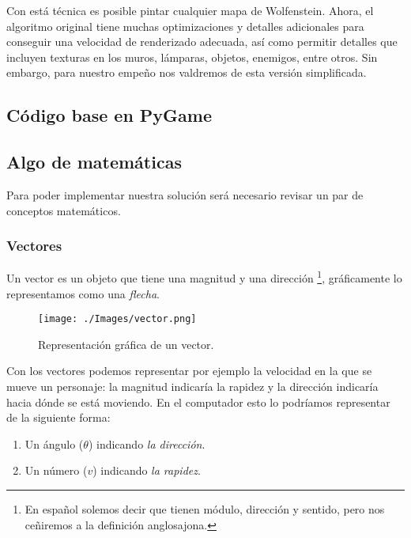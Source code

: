 Con está técnica es posible pintar cualquier mapa de Wolfenstein. Ahora, el algoritmo original tiene muchas optimizaciones y detalles adicionales para conseguir una velocidad de renderizado adecuada, así como permitir detalles que incluyen texturas en los muros, lámparas, objetos, enemigos, entre otros. Sin embargo, para nuestro empeño nos valdremos de esta versión simplificada.

\newpage
\clearpage

\subsection{Código base en PyGame}




\newpage 
\subsection{Algo de matemáticas}

Para poder implementar nuestra solución será necesario revisar un par de conceptos matemáticos. 

\subsubsection{Vectores}

Un vector es un objeto que tiene una magnitud y una dirección \cite{introVectors} \footnote{En español solemos decir que tienen módulo, dirección y sentido, pero nos ceñiremos a la definición anglosajona.}, gráficamente lo representamos como una \emph{flecha}.
 
 \begin{figure}[h!]
 	\centering
 	\texttt{[image: ./Images/vector.png]}
 	\caption{Representación gráfica de un vector.}
 	\label{vector}
 \end{figure}

Con los vectores podemos representar por ejemplo la velocidad en la que se mueve un personaje: la magnitud indicaría la rapidez y la dirección indicaría hacia dónde se está moviendo. En el computador esto lo podríamos representar de la siguiente forma:

\begin{enumerate}
\item Un ángulo ($\theta$) indicando \emph{la dirección}.

\item Un número ($v$) indicando \emph{la rapidez}.
\end{enumerate}


